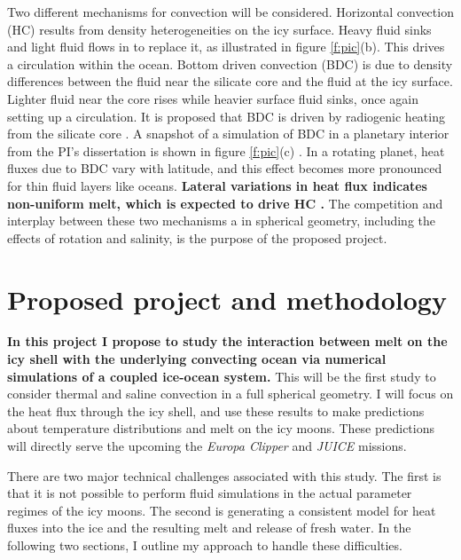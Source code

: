 \documentclass[12pt]{article}
\begin{document}
Two different mechanisms for convection will be considered.
Horizontal convection (HC) results from density heterogeneities on the icy surface. Heavy fluid sinks and light fluid flows in to replace it, as illustrated in figure \ref{f:pic}(b). This drives a circulation within the ocean. Bottom driven convection (BDC) is due to density differences between the fluid near the silicate core and the fluid at the icy surface. Lighter fluid near the core rises while heavier surface fluid sinks, once again setting up a circulation. 
It is proposed that BDC is driven by radiogenic heating from the silicate core \citep{kS14,kS19,jK22}. A snapshot of a simulation of BDC in a planetary interior from the PI's dissertation is shown in figure \ref{f:pic}(c) \citep{tO25}. 
In a rotating planet, heat fluxes due to BDC vary with latitude, and this effect becomes more pronounced for thin fluid layers like oceans\citep{tG23}. \textbf{Lateral variations in heat flux indicates non-uniform melt, which is expected to drive HC \citep{wK22}.}
The competition and interplay between these two mechanisms a in spherical geometry, including the effects of rotation and salinity, is the purpose of the proposed project.


\section{Proposed project and methodology}

\textbf{In this project I propose to study the interaction between melt on the icy shell with the underlying convecting ocean via numerical simulations of a coupled ice-ocean system.} This will be the first study to consider thermal and saline convection in a full spherical geometry.
I will focus on the heat flux through the icy shell, and use these results to make predictions about temperature distributions and melt on the icy moons. These predictions will directly serve the upcoming the \textit{Europa Clipper} and \textit{JUICE} missions.

There are two major technical challenges associated with this study. The first is that it is not possible to perform fluid simulations in the actual parameter regimes of the icy moons. The second is generating a consistent model for heat fluxes into the ice and the resulting melt and release of fresh water.
In the following two sections, I outline my approach to handle these difficulties.
\end{document}
